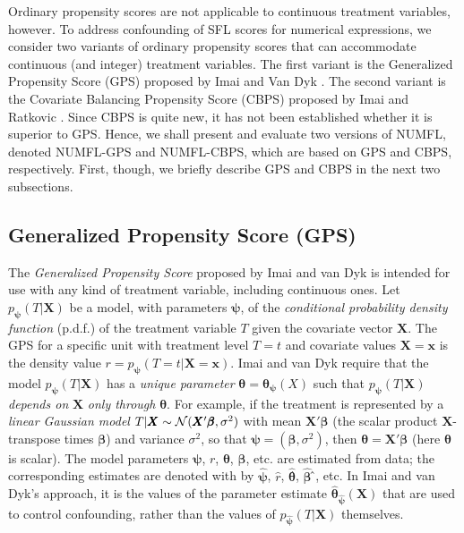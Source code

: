 \documentclass[times]{stvrauth}
\begin{document}
Ordinary propensity scores are not applicable to continuous treatment variables, however.  To address confounding of SFL scores for numerical expressions, we consider two variants of ordinary propensity scores that can accommodate continuous (and integer) treatment variables.  The first variant is the Generalized Propensity Score (GPS) proposed by Imai and Van Dyk \cite{Imai2004}.  The second variant is the Covariate Balancing Propensity Score (CBPS) proposed by Imai and Ratkovic \cite{Imai2014}.  Since CBPS is quite new, it has not been established whether it is superior to GPS.  Hence, we shall present and evaluate two versions of NUMFL, denoted NUMFL-GPS and NUMFL-CBPS, which are based on GPS and CBPS, respectively.  First, though, we briefly describe GPS and CBPS in the next two subsections.

\subsection{Generalized Propensity Score (GPS)}\label{IIIC}
The {\it Generalized Propensity Score} proposed by Imai and van Dyk \cite{Imai2004} is intended for use with any kind of treatment variable, including continuous ones.  Let ${p_{\pmb{\psi}} }(T|\pmb{X})$  be a model, with parameters $\pmb{\psi}$, of the {\it conditional probability density function} (p.d.f.) of the treatment variable $T$ given the covariate vector $\pmb{X}$.  The GPS for a specific unit with treatment level $T=t$ and covariate values $\pmb{X=x}$ is the density value $r = {p_{\pmb\psi} }(T = t|{\pmb X} = {\pmb x})$.  Imai and van Dyk \cite{Imai2004} require that the model ${p_{\pmb{\psi}} }(T|\pmb{X})$ has a {\it unique parameter} ${\pmb\theta}  = \pmb{\theta _\psi }(X)$ such that ${p_{\pmb{\psi}} }(T|\pmb{X})$ {\it depends on} $\pmb X$ {\it only through} $\pmb \theta$.  For example, if the treatment is represented by a {\it linear Gaussian model} $T|\pmb{X} \sim {\cal N}(\pmb{X}'{\pmb \beta} ,{\sigma ^2})$ with mean $\pmb{X}'{\pmb \beta}$  (the scalar product $\pmb{X}$-transpose times $\pmb{\beta}$) and variance $\sigma ^2$, so that $\pmb{\psi}  = \left( {\pmb{\beta} ,{\sigma ^2}} \right)$, then $\pmb{\theta}  = \pmb{X}'\pmb{\beta} $ (here $\pmb{\theta} $ is scalar).  The model parameters $\pmb{\psi}$, $r$, $\pmb{\theta}$, $\pmb{\beta}$, etc. are estimated from data; the corresponding estimates are denoted with by $\hat {\pmb\psi} $, $\hat r$,  $\hat{ \pmb{\theta}} $̂, $\hat{ \pmb{\beta}}$ ̂, etc.  In Imai and van Dyk's approach, it is the values of the parameter estimate ${{\hat{\pmb{\theta}} }_{\hat{ \pmb{\psi}} }}(\pmb{X})$ that are used to control confounding, rather than the values of ${p_{\hat{ \pmb{\psi}} }}(T|\pmb{X})$ themselves.
\end{document}
